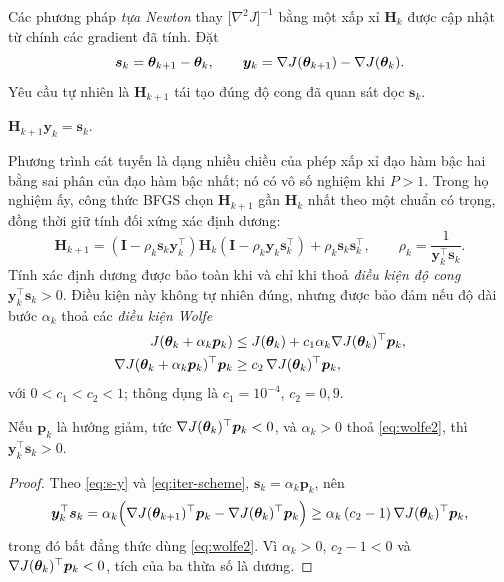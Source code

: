 Các phương pháp \emph{tựa Newton} thay $\big[\nabla^2 J\big]^{-1}$ bằng một xấp
xỉ $\bm{H}_k$ được cập nhật từ chính các gradient đã tính. Đặt
\begin{equation}
\bm{s}_k = \bm{\theta}_{k+1}-\bm{\theta}_k,
\qquad
\bm{y}_k = \nabla J(\bm{\theta}_{k+1}) - \nabla J(\bm{\theta}_k).
\label{eq:s-y}
\end{equation}
Yêu cầu tự nhiên là $\bm{H}_{k+1}$ tái tạo đúng độ cong đã quan sát dọc
$\bm{s}_k$.
 
\begin{definition}
\label{def:secant}
$\bm{H}_{k+1}\bm{y}_k = \bm{s}_k$.
\end{definition}
 
Phương trình cát tuyến là dạng nhiều chiều của phép xấp xỉ đạo hàm bậc hai bằng
sai phân của đạo hàm bậc nhất; nó có vô số nghiệm khi $P > 1$. Trong họ nghiệm
ấy, công thức BFGS chọn $\bm{H}_{k+1}$ gần $\bm{H}_k$ nhất theo một chuẩn có
trọng, đồng thời giữ tính đối xứng xác định dương:
\begin{equation}
\bm{H}_{k+1} = \left(\bm{I}-\rho_k \bm{s}_k \bm{y}_k^{\top}\right)
\bm{H}_k
\left(\bm{I}-\rho_k \bm{y}_k \bm{s}_k^{\top}\right)
+ \rho_k \bm{s}_k\bm{s}_k^{\top},
\qquad
\rho_k = \frac{1}{\bm{y}_k^{\top}\bm{s}_k}.
\label{eq:bfgs}
\end{equation}
Tính xác định dương được bảo toàn khi và chỉ khi thoả \emph{điều kiện độ cong}
$\bm{y}_k^{\top}\bm{s}_k > 0$. Điều kiện này không tự nhiên đúng, nhưng được bảo
đảm nếu độ dài bước $\alpha_k$ thoả các \emph{điều kiện Wolfe}
\begin{align}
J(\bm{\theta}_k + \alpha_k \bm{p}_k)
  &\le J(\bm{\theta}_k) + c_1 \alpha_k \nabla J(\bm{\theta}_k)^{\top}\bm{p}_k,
\label{eq:wolfe1}\\
\nabla J(\bm{\theta}_k + \alpha_k \bm{p}_k)^{\top}\bm{p}_k
  &\ge c_2\, \nabla J(\bm{\theta}_k)^{\top}\bm{p}_k,
\label{eq:wolfe2}
\end{align}
với $0 < c_1 < c_2 < 1$; thông dụng là $c_1 = 10^{-4}$, $c_2 = 0{,}9$.
 
\begin{bode}
\label{bd:wolfe-curvature}
Nếu $\bm{p}_k$ là hướng giảm, tức $\nabla J(\bm{\theta}_k)^{\top}\bm{p}_k < 0$, và
$\alpha_k > 0$ thoả \eqref{eq:wolfe2}, thì
$\bm{y}_k^{\top}\bm{s}_k > 0$.
\end{bode}
 
\begin{proof}
Theo \eqref{eq:s-y} và \eqref{eq:iter-scheme}, $\bm{s}_k = \alpha_k\bm{p}_k$, nên
\[
\bm{y}_k^{\top}\bm{s}_k
 = \alpha_k\Big(\nabla J(\bm{\theta}_{k+1})^{\top}\bm{p}_k
   - \nabla J(\bm{\theta}_k)^{\top}\bm{p}_k\Big)
 \ge \alpha_k\,(c_2 - 1)\,\nabla J(\bm{\theta}_k)^{\top}\bm{p}_k,
\]
trong đó bất đẳng thức dùng \eqref{eq:wolfe2}. Vì $\alpha_k > 0$, $c_2 - 1 < 0$
và $\nabla J(\bm{\theta}_k)^{\top}\bm{p}_k < 0$, tích của ba thừa số là dương.
\end{proof}
 
